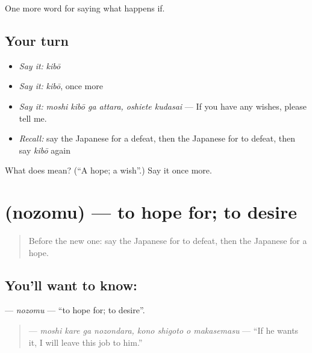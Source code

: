 \begin{grammarlens}[title={What you've built}]
One more word for saying what happens if.
\end{grammarlens}

\subsection*{Your turn}
\begin{itemize}
\raggedright
  \item \emph{Say it:} \emph{kibō}
  \item \emph{Say it:} \emph{kibō}, once more
  \item \emph{Say it:} \emph{moshi kibō ga attara, oshiete kudasai} — If you have any wishes, please tell me.
  \item \emph{Recall:} say the Japanese for a defeat, then the Japanese for to defeat, then say \emph{kibō} again
\end{itemize}

\begin{tcolorbox}[breakable,colback=teal!4,colframe=teal!35!black,title={Before you move on}]
What does  mean? (\textquotedblleft{}A hope; a wish\textquotedblright{}.) Say it once more.
\end{tcolorbox}
\section[\texorpdfstring{\ja{のぞむ} (nozomu)}{のぞむ (nozomu)}]{ (nozomu) — to hope for; to desire}

\label{lesson:JA-C507-nozomu}



\begin{quote}
Before the new one: say the Japanese for to defeat, then the Japanese for a hope.
\end{quote}

\subsection*{You'll want to know: }
\textbf{} — \emph{nozomu} — \textquotedblleft{}to hope for; to desire\textquotedblright{}.

\begin{quote}
\textbf{    } — \emph{moshi kare ga nozondara, kono shigoto o makasemasu} — \textquotedblleft{}If he wants it, I will leave this job to him.\textquotedblright{}
\end{quote}

